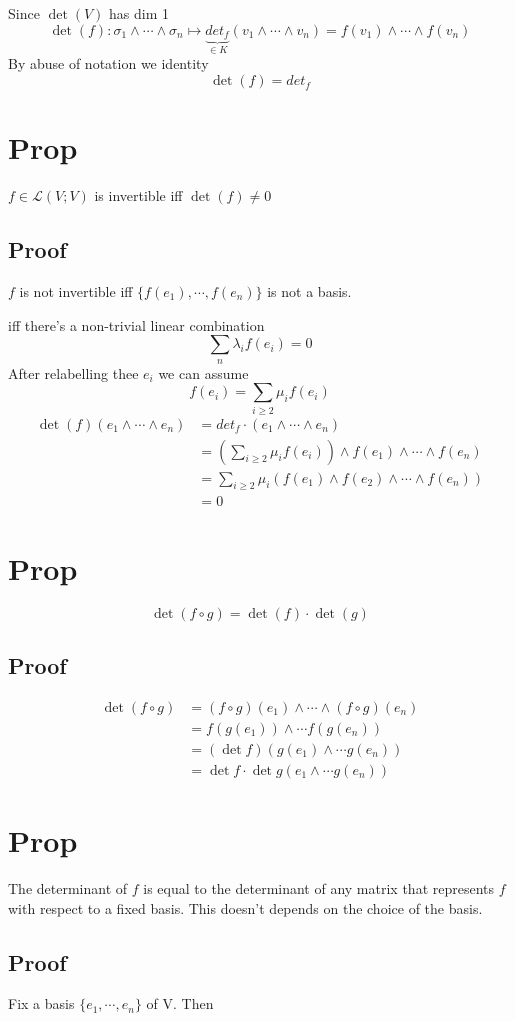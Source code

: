 \documentclass{book}
\begin{document}
Since $\det(V)$ has dim 1
$$\det (f):\sigma_1\wedge\cdots\wedge\sigma_n\mapsto {\underbrace{det_f}\limits_{\in K}}(v_1\wedge\cdots\wedge v_n)=f(v_1)\wedge\cdots\wedge f(v_n)$$
By abuse of notation we identity $$\det(f)=det _f$$
\section{Prop}
$f\in \mathscr{L}(V;V)$ is invertible iff $\det(f)\neq 0$
\subsection{Proof}
$f$ is not invertible iff $\{f(e_1),\cdots,f(e_n)\}$ is not a basis.

iff there's a non-trivial linear combination
$$\sum\limits_n\lambda_if(e_i)=0$$
After relabelling thee $e_i$ we can assume 
$$f(e_i)=\sum\limits_{i\geq 2}\mu_if(e_i)$$
$$\begin{aligned}
    \det (f)(e_1\wedge\cdots\wedge e_n)&=det_f\cdot(e_1\wedge\cdots\wedge e_n)\\
    &=(\sum\limits_{i\geq 2}\mu_if(e_i))\wedge f(e_1)\wedge\cdots\wedge f(e_n)\\
    &=\sum\limits_{i\geq 2}\mu_i(f(e_1)\wedge f(e_2)\wedge\cdots\wedge f(e_n))\\
    &=0
\end{aligned}$$
\section{Prop}
$$\det(f\circ g)=\det(f)\cdot\det(g)$$
\subsection*{Proof}
$$\begin{aligned}
    \det(f\circ g) &=(f\circ g)(e_1)\wedge\cdots\wedge(f\circ g)(e_n)\\
    &=f(g(e_1))\wedge\cdots f(g(e_n))\\
    &=(\det f)(g(e_1)\wedge\cdots g(e_n))\\
    &=\det f\cdot\det g(e_1\wedge\cdots g(e_n))
\end{aligned}$$
\section{Prop}
The determinant of $f$ is equal to the determinant of any matrix that represents $f$ with respect to a fixed basis. This doesn't depends on the choice of the basis.
\subsection*{Proof}
Fix a basis $\{e_1,\cdots,e_n\}$ of V. Then
\end{document}
